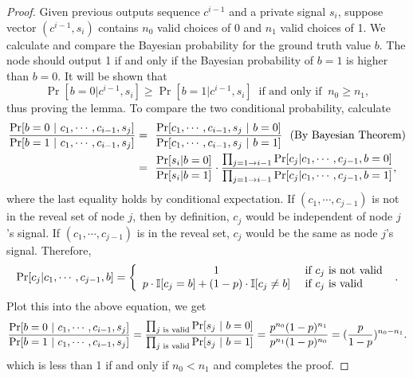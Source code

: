 \documentclass[a4paper,UKenglish]{lipics}
\theoremstyle{definition}
\newcommand\I{\mathbb{I}}
\begin{document}
\begin{proof}
Given previous outputs sequence $c^{i-1}$ and a private signal $s_i$, 
	suppose vector $(c^{i-1}, s_i)$ contains $n_0$ valid choices of 0 and $n_1$ valid choices of 1. 
We calculate and compare the Bayesian probability for the ground truth value $b$.
The node should output 1 if and only if the Bayesian probability of $b=1$ is higher than $b=0$.
It will be shown that
\begin{equation*}
	\Pr[b = 0 | c^{i-1},s_i] \ge \Pr[b = 1|c^{i-1},s_i] 
	~\text{ if and only if }~ 
	n_0 \ge n_1,
\end{equation*}
thus proving the lemma. 
To compare the two conditional probability, calculate
\begin{align*}
	{\Pr[b = 0~|~c_1, \dotsb, c_{i - 1}, s_j ] 
	\over  
	\Pr[b = 1~|~c_1, \dotsb, c_{i - 1}, s_j ]} 
= & 
	~~{\Pr[c_1, \dotsb, c_{i - 1}, s_j ~|~ b = 0]
	\over
	\Pr[c_1, \dotsb, c_{i - 1}, s_j ~|~ b = 1]}
	~~
	(\text{By Bayesian Theorem})
\\
= &
	~~{\Pr[s_i|b = 0] \over  \Pr[s_i|b = 1]} 
	\cdot 
		{\prod_{j = 1 \to i-1} \Pr[c_j|c_1, \dotsb, c_{j - 1}, b = 0]
		\over
		\prod_{j = 1 \to i-1} \Pr[c_j|c_1, \dotsb, c_{j - 1}, b = 1]},
\end{align*}
where the last equality holds by conditional expectation. 
If $(c_1, \dotsb, c_{j - 1})$ is not in the reveal set of node $j$, 
	then by definition, $c_j$ would be independent of node $j$'s signal. 
If $(c_1, \dotsb, c_{j - 1})$ is in the reveal set, $c_j$ would be the same as node $j$'s signal. 
Therefore,
\begin{equation*}
	\Pr[c_j|c_1, \dotsb, c_{j - 1}, b] = 
	\left\{
	\begin{array} {c l}
	1 & \text{ if $c_j$ is not valid } \\
	p\cdot \I[c_j = b] + (1-p)\cdot \I[c_j\neq b] & \text{ if $c_j$ is valid } \\
	\end{array}
	\right..
\end{equation*}
Plot this into the above equation, we get	
\begin{align*}
	{\Pr[b = 0~|~c_1, \dotsb, c_{i - 1}, s_j ] 
	\over
	 \Pr[b = 1~|~c_1, \dotsb, c_{i - 1}, s_j ] }
= 
	{\prod_{j\text{ is valid}} \Pr[s_j~|~ b = 0]
	\over
	\prod_{j\text{ is valid}} \Pr[s_j~|~ b = 1]}
= 
	{ p^{n_0}(1-p)^{n_1} \over p^{n_1}(1-p)^{n_0} }
=
	({p \over  1 - p})^{n_0 - n_1}.
\end{align*}
which is less than 1 if and only if $n_0 < n_1$ and completes the proof.
\end{proof}
\end{document}
